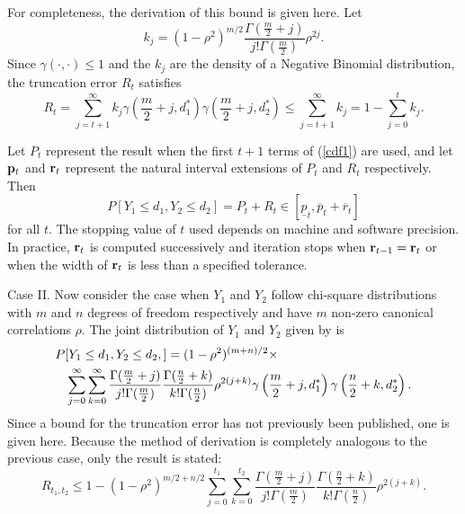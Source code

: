 For completeness, the derivation of this bound is 
given here.  Let 
$$
k_j =   (1-\rho^2)^{m/2} 
  \frac{\Gamma (\frac{m}{2}+j)} {j! \Gamma (\frac{m}{2})} 
  \rho^{2j}.
$$
Since $\gamma(\cdot,\cdot) \leq 1$ 
and the $k_j$ are the density of a Negative Binomial
distribution, the truncation error $R_t$ satisfies
$$
R_t = \sum_{j=t+1}^\infty k_j 
  \gamma\left( \frac{m}{2}+j , d_1^*\right)
  \gamma\left( \frac{m}{2}+j , d_2^*\right)
  \leq \sum_{j=t+1}^\infty k_j
 = 1 - \sum_{j=0}^t k_j.
$$

Let $P_t$ represent the result when the first $t+1$ terms of
(\ref{cdf1}) are used, and let 
${\bf p}_t$ and ${\bf r}_t$ represent the natural interval extensions of 
$P_t$ and $R_t$ respectively.  Then
$$P[Y_1 \leq d_1, Y_2 \leq d_2] = P_t + R_t \in
 [ \underline{p}_t , \overline{p}_t + \overline{r}_t]$$
 for all $t$.
The stopping value of $t$  
used depends on machine and software precision.  In
practice, ${\bf r}_t$ is computed successively and iteration stops when 
${\bf r}_{t-1} = {\bf r}_t$ or when the width of ${\bf r}_{t}$ is less than
a specified tolerance.


Case II.
Now consider the case when $Y_1$ and $Y_2$ follow chi-square distributions
with $m$ and $n$ degrees of freedom respectively and have $m$ non-zero
canonical correlations $\rho$.
The joint distribution of $Y_1$ and $Y_2$ given by \cite{Gunst} is
\begin{eqnarray}
\lefteqn{P[Y_1 \leq d_1, Y_2 \leq d_2, ] = 
  (1-\rho^2)^{(m+n)/2} \times}\nonumber \\
  & & 
  \sum_{j=0}^\infty \sum_{k=0}^\infty 
  \frac{ \Gamma (\frac{m}{2}+j)}{ j! \Gamma (\frac{m}{2})  }
  \frac{ \Gamma (\frac{n}{2}+k)}{ k! \Gamma (\frac{n}{2})  }
  \rho^{2(j+k)} 
  \gamma \left(\frac{m}{2}+j, d_1^* \right)  
  \gamma \left(\frac{n}{2}+k, d_2^* \right). 
  \label{cdf2}
\end{eqnarray}
Since a bound for the truncation error has not previously been published, one
is given here.  Because the method of 
derivation is completely analogous to the previous case, only the result
is stated:
\begin{equation}
\label{error2}
R_{t_1, t_2} \leq 1- (1-\rho^2)^{m/2 + n/2}
  \sum_{j=0}^{t_1} \sum_{k=0}^{t_2} 
  \frac{\Gamma (\frac{m}{2}+j)}{ j! \Gamma (\frac{m}{2}) }
  \frac{\Gamma (\frac{n}{2}+k)}{ k! \Gamma (\frac{n}{2}) }
  \rho^{2(j +k)}.
\end{equation}


